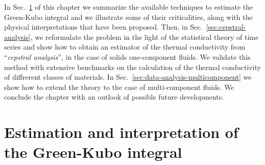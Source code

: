\begin{LEtext}
In Sec.~\ref{sec:data-analysis-methods} of this chapter we summarize the available techniques to estimate the Green-Kubo integral and we illustrate some of their criticalities, along with the physical interpretations that have been proposed. Then, in Sec.~\ref{sec:cepstral-analysis}, we reformulate the problem in the light of the statistical theory of time series and show how to obtain an estimator of the thermal conductivity from ``\emph{cepstral analysis}'', in the case of solids one-component fluids. We validate this method with extensive benchmarks on the calculation of the thermal conductivity of diffrerent classes of materials. In Sec.~\ref{sec:data-analysis-multicomponent} we show how to extend the theory to the case of multi-component fluids. 
We conclude the chapter with an outlook of possible future developments. 

\end{LEtext}


\section{Estimation and interpretation of the Green-Kubo integral} \label{sec:data-analysis-methods}

